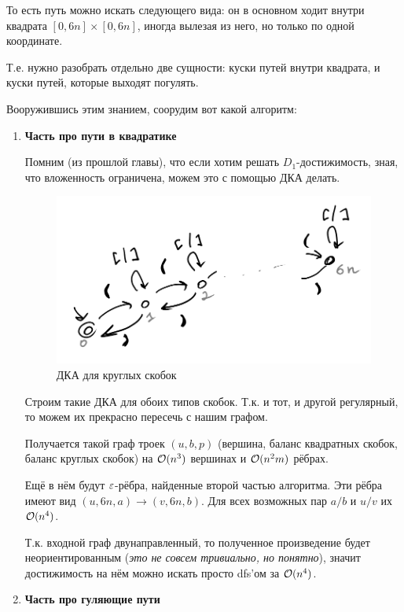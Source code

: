 \begin{note}
    То есть путь можно искать следующего вида: он в основном ходит внутри квадрата $[0, 6n] \times [0, 6n]$, иногда вылезая из него, но только по одной координате.

    Т.е. нужно разобрать отдельно две сущности: куски путей внутри квадрата, и куски путей, которые выходят погулять.
\end{note}

Вооружившись этим знанием, соорудим вот какой алгоритм:

\begin{enumerate}
    \item {\bf Часть про пути в квадратике}

    Помним (из прошлой главы), что если хотим решать $D_1$-достижимость, зная, что вложенность ограничена, можем это с помощью ДКА делать.

    \begin{figure}[H]
        \includegraphics[width=0.75\linewidth]{img/dyck_1_1_dfa}
        \caption{ДКА для круглых скобок}
    \end{figure}

    Строим такие ДКА для обоих типов скобок. Т.к. и тот, и другой регулярный, то можем их прекрасно пересечь с нашим графом. 

    Получается такой граф троек $(u, b, p)$ (вершина, баланс квадратных скобок, баланс круглых скобок) на $\mathcal{O}(n^3)$ вершинах и $\mathcal{O}(n^2 m)$ рёбрах.

    Ещё в нём будут $\varepsilon$-рёбра, найденные второй частью алгоритма. Эти рёбра имеют вид $(u, 6n, a) \to (v, 6n, b)$. Для всех возможных пар $a/b$ и $u/v$ их $\mathcal{O}(n^4)$.

    Т.к. входной граф двунаправленный, то полученное произведение будет неориентированным (\textit{это не совсем тривиально, но понятно}), значит достижимость на нём можно искать просто dfs'ом за $\mathcal{O}(n^4)$.

    \item {\bf Часть про гуляющие пути}


\end{enumerate}
